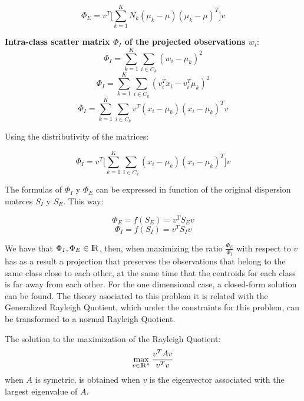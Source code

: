 \begin{equation}\label{eq:2.10}
\Phi_{E} = v^T \big[ \sum\limits_{k =1}^{K} N_k ( \mu_k - \mu )(\mu_k - \mu )^T \big] v	
\end{equation}

\textbf{Intra-class scatter matrix $\Phi_{I}$ of the projected observations $w_i$}:
$$\Phi_{I} = \sum\limits_{k = 1}^{K} \sum\limits_{i \in C_k} (w_i - \widehat{\mu}_k)^2 $$
$$\Phi_{I} = \sum\limits_{k = 1}^{K} \sum\limits_{i \in C_k} (v_i^T x_i - v_i^T \mu_k)^{2} $$
$$\Phi_{I} =  \sum\limits_{k = 1}^{K} \sum\limits_{i \in C_k} v^T( x_i - \mu_k) ( x_i - \mu_k)^T v  $$

Using the distributivity of the matrices:

\begin{equation}\label{eq:2.11}
\Phi_{I} = v^T \big[ \sum\limits_{k = 1}^{K} \sum\limits_{i \in C_k} ( x_i - \mu_k) ( x_i - \mu_k)^T \big] v	
\end{equation}

The formulas of $\Phi_{I}$ y $\Phi_{E}$ can be expressed in function of the original dispersion matrces $S_I$ y $S_E$. This way:

 $$\Phi_{E} = f(S_E) = v^T S_E v$$
 $$\Phi_{I} = f(S_I) = v^T S_I v$$

We have that $\Phi_{I}, \Phi_{E} \in {\rm I\!R}$, then, when maximizing the ratio $\frac{\Phi_{E}}{\Phi_{I}}$ with respect to $v$ has as a result a projection that preserves the observations that belong to the same class close to each other, at the same time that the centroids for each class is far away from each other. For the one dimensional case, a closed-form solution can be found. The theory asociated to this problem it is related with the Generalized Rayleigh Quotient, which under the constraints for this problem, can be transformed to a normal Rayleigh Quotient.

\begin{proposition} \label{lemma2.2}
The solution to the maximization of the Rayleigh Quotient:
$$\max_{v \in {\rm I\!R}^{n} } \frac{v^T A v}{v^Tv} $$
when $A$ is symetric, is obtained when $v$ is the eigenvector associated with the largest eigenvalue of $A$.
\end{proposition}

